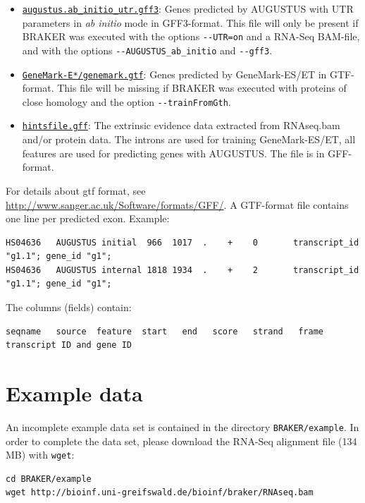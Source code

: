 \documentclass[a4paper,10pt]{report}
\begin{document}
\begin{itemize}
	\item \underline{\texttt{augustus.ab\_initio\_utr.gff3}}: Genes predicted by AUGUSTUS with UTR parameters in \textit{ab initio} mode in GFF3-format. This file will only be present if BRAKER was executed with  the options \texttt{-{}-UTR=on} and a RNA-Seq BAM-file, and with the options \texttt{-{}-AUGUSTUS\_ab\_initio} and \texttt{-{}-gff3}.
	
	\item \underline{\texttt{GeneMark-E*/genemark.gtf}}: Genes predicted by GeneMark-ES/ET in GTF-format. This file will be missing if BRAKER was executed with proteins of close homology and the option \texttt{-{}-trainFromGth}.
	
	\item \underline{\texttt{hintsfile.gff}}: The extrinsic evidence data extracted from RNAseq.bam and/or protein
	data. The introns are used for training GeneMark-ES/ET, all features
	are used for predicting genes with AUGUSTUS. The file is in GFF-format.
\end{itemize}



For details about gtf format, see \url{http://www.sanger.ac.uk/Software/formats/GFF/}. A GTF-format file
contains one line per predicted exon. Example:

\begin{verbatim}
HS04636   AUGUSTUS initial  966  1017  .    +    0       transcript_id "g1.1"; gene_id "g1";
HS04636   AUGUSTUS internal 1818 1934  .    +    2       transcript_id "g1.1"; gene_id "g1";
\end{verbatim}

The columns (fields) contain: 

\begin{verbatim}
seqname   source  feature  start   end   score   strand   frame  transcript ID and gene ID
\end{verbatim}


\chapter{Example data}

An incomplete example data set is contained in the directory \texttt{BRAKER/example}. In order to complete the data set, please download the RNA-Seq alignment file (134 MB) with \texttt{wget}:

\begin{verbatim}
cd BRAKER/example
wget http://bioinf.uni-greifswald.de/bioinf/braker/RNAseq.bam
\end{verbatim}
\end{document}

